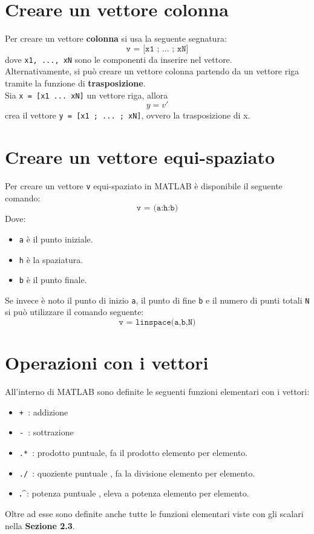 \section{Creare un vettore colonna}
Per creare un vettore \textbf{colonna} si usa la seguente segnatura:
$$ \texttt{v = [x1 ; ... ; xN]} $$
dove \texttt{x1, ..., xN} sono le componenti da inserire nel vettore. \\
Alternativamente, si può creare un vettore colonna partendo da un vettore riga tramite la funzione di 
\textbf{trasposizione}. \\
Sia \texttt{x = [x1 ... xN]} un vettore riga, allora 
$$ y = v' $$
crea il vettore \texttt{y = [x1 ; ... ; xN]}, ovvero la trasposizione di x.

\newpage

\section{Creare un vettore equi-spaziato}
Per creare un vettore \texttt{v} equi-spaziato in MATLAB è disponibile il seguente comando:
$$ \texttt{v = (a:h:b)} $$
Dove:
\begin{itemize}
	\item 	\texttt{a} è il punto iniziale.
	\item	\texttt{h} è la spaziatura.
	\item	\texttt{b} è il punto finale.
\end{itemize}

Se invece è noto il punto di inizio \texttt{a}, il punto di fine \texttt{b} e il numero di punti totali \texttt{N} si 
può utilizzare il comando seguente:
$$ \texttt{v = linspace(a,b,N)} $$


\section{Operazioni con i vettori}
All'interno di MATLAB sono definite le seguenti funzioni elementari con i vettori:
\begin{itemize}

	\item	\texttt{+ }: addizione
	\item	\texttt{- }: sottrazione
	\item	\texttt{.* }: prodotto puntuale, fa il prodotto elemento per elemento.
	\item	\texttt{./ }: quoziente puntuale , fa la divisione elemento per elemento.
	\item	\textbf{.\^}: potenza puntuale , eleva a potenza elemento per elemento.

\end{itemize}

Oltre ad esse sono definite anche tutte le funzioni elementari viste con gli scalari nella \textbf{Sezione 2.3}.
